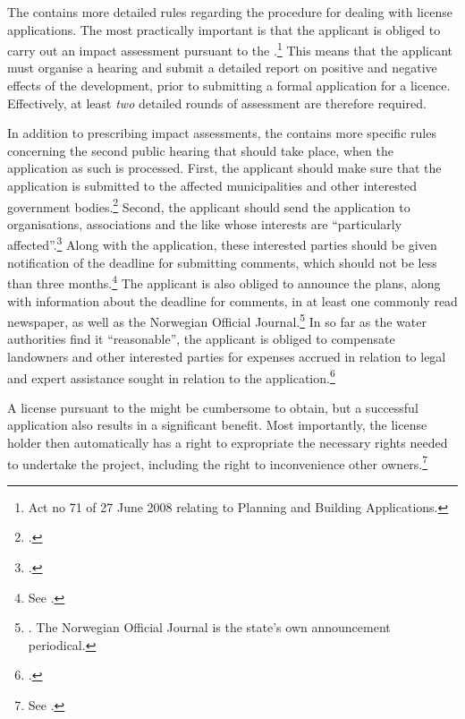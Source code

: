 The \cite{wra17} contains more detailed rules regarding the procedure for dealing with license applications. The most practically important is that the applicant is obliged to carry out an impact assessment pursuant to the \cite{pb08}.\footnote{Act no 71 of 27 June 2008 relating to Planning and Building Applications.} This means that the applicant must organise a hearing and submit a detailed report on positive and negative effects of the development, prior to submitting a formal application for a licence. Effectively, at least {\it two} detailed rounds of assessment are therefore required. %

In addition to prescribing impact assessments, the \cite{wra17} contains more specific rules concerning the second public hearing that should take place, when the application as such is processed. First, the applicant should make sure that the application is submitted to the affected municipalities and other interested government bodies.\footcite[6]{wra17} Second, the applicant should send the application to organisations, associations and the like whose interests are ``particularly affected''.\footcite[6]{wra17} Along with the application, these interested parties should be given notification of the deadline for submitting comments, which should not be less than three months.\footnote{See \cite[6]{wra17}.} The applicant is also obliged to announce the plans, along with information about the deadline for comments, in at least one commonly read newspaper, as well as the Norwegian Official Journal.\footnote{\cite[6]{wra17}. The Norwegian Official Journal is the state's own announcement periodical.} In so far as the water authorities find it ``reasonable'', the applicant is obliged to compensate landowners and other interested parties for expenses accrued in relation to legal and expert assistance sought in relation to the application.\footcite[6]{wra17}

A license pursuant to the \cite{wra17} might be cumbersome to obtain, but a successful application also results in a significant benefit. Most importantly, the license holder then automatically has a right to expropriate the necessary rights needed to undertake the project, including the right to inconvenience other owners.\footnote{See \cite[16]{wra17}.} 

